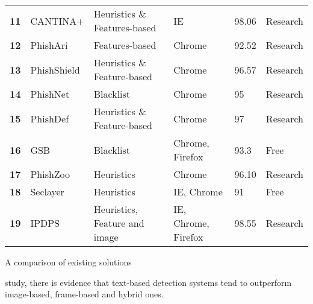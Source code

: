 \begin{center}
\begin{tabular}{  m{0.5em}  m{6em}  m{13.3em}  m{8.5em}  m{2.3em}  m{4.3em}  }
		\multicolumn{1}{r}{\textbf{11}} & CANTINA+         & Heuristics \& Features-based    & IE                  & 98.06        & Research      \\

		\multicolumn{1}{r}{\textbf{12}} & PhishAri         & Features-based                  & Chrome              & 92.52        & Research      \\

		\multicolumn{1}{r}{\textbf{13}} & PhishShield      & Heuristics \& Feature-based     & Chrome              & 96.57        & Research      \\

		\multicolumn{1}{r}{\textbf{14}} & PhishNet         & Blacklist                       & Chrome              & 95           & Research      \\

		\multicolumn{1}{r}{\textbf{15}} & PhishDef         & Heuristics \& Feature-based     & Chrome              & 97           & Research      \\

		\multicolumn{1}{r}{\textbf{16}} & GSB              & Blacklist                       & Chrome, Firefox     & 93.3         & Free          \\

		\multicolumn{1}{r}{\textbf{17}} & PhishZoo         & Heuristics                      & Chrome              & 96.10        & Research      \\

		\multicolumn{1}{r}{\textbf{18}} & Seclayer         & Heuristics                      & IE, Chrome          & 91           & Free          \\

		\multicolumn{1}{r}{\textbf{19}} & IPDPS            & Heuristics, Feature and image   & IE, Chrome, Firefox & 98.55        & Research      \\ \bottomrule
	\end{tabular}
	\captionsetup{type=table}\caption{A comparison of existing solutions \citep{Adebowale}}
	\label{tab:EXISTENT_SOLUTIONS}
\end{center}

{\parindent0pt study, there is evidence that text-based detection systems tend to outperform image-based, frame-based and hybrid ones.}

